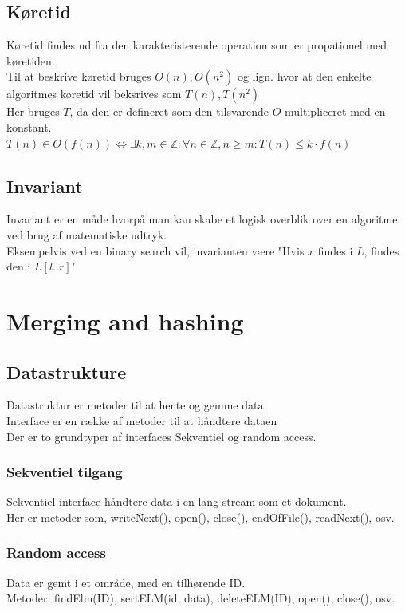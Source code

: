 \documentclass[12pt, a4paper]{article}
\begin{document}
				\subsection{Køretid}
					Køretid findes ud fra den karakteristerende operation som er propationel med køretiden.\\
					Til at beskrive køretid bruges $O(n), O(n^2)$ og lign. hvor at den enkelte algoritmes køretid vil beksrives som $T(n),T(n^2)$\\
					Her bruges $T$, da den er defineret som den tilsvarende $O$ multipliceret med en konstant.\\	
					$T(n)\in O(f(n)) \iff \exists k,m \in \mathbb{Z}:\forall n \in \mathbb{Z}, n\geq m : T(n)\leq k\cdot f(n)$
				\subsection{Invariant}
					Invariant er en måde hvorpå man kan skabe et logisk overblik over en algoritme ved brug af matematiske udtryk.\\
					Eksempelvis ved en binary search vil, invarianten være "Hvis $x$ findes i $L$, findes den i $L[l..r]$"
		\section{Merging and hashing}
			\subsection{Datastrukture}
				Datastruktur er metoder til at hente og gemme data.\\
				Interface er en række af metoder til at håndtere dataen\\
				Der er to grundtyper af interfaces Sekventiel og random access.
				\subsubsection{Sekventiel tilgang}
					Sekventiel interface håndtere data i en lang stream som et dokument.\\
					Her er metoder som, writeNext(), open(), close(), endOfFile(), readNext(), osv.\\
				\subsubsection{Random access}
					Data er gemt i et område, med en tilhørende ID.\\
					Metoder: findElm(ID), sertELM(id, data), deleteELM(ID), open(), close(), osv.
\end{document}
